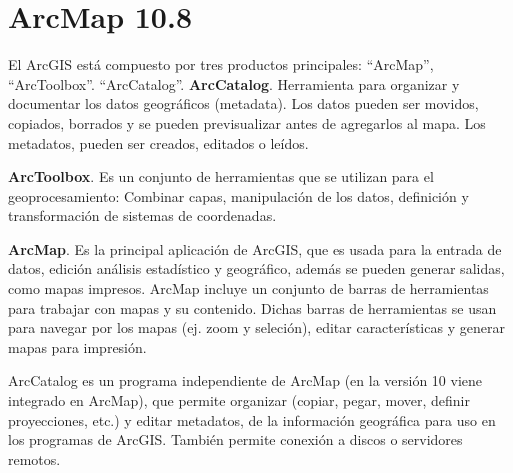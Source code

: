 \section{ArcMap 10.8}

El ArcGIS está compuesto por tres productos principales: ``ArcMap'', ``ArcToolbox''. ``ArcCatalog''.
\textbf{ArcCatalog}. Herramienta para organizar y documentar los datos geográficos (metadata). Los datos pueden ser movidos, copiados, borrados y se pueden previsualizar antes de agregarlos al mapa. Los metadatos, pueden ser creados, editados o leídos.

\textbf{ArcToolbox}. Es un conjunto de herramientas que se utilizan para el geoprocesamiento: Combinar capas, manipulación de los datos, definición y transformación de sistemas de coordenadas. 

\textbf{ArcMap}. Es la principal aplicación de ArcGIS, que es usada para la entrada de datos, edición análisis estadístico y geográfico, además se pueden generar salidas, como mapas impresos. ArcMap incluye un conjunto de barras de herramientas para trabajar con mapas y su contenido. Dichas barras de herramientas se usan para navegar por los mapas (ej. zoom y seleción), editar características y generar mapas para impresión.

ArcCatalog es un programa independiente de ArcMap (en la versión 10 viene integrado en ArcMap), que permite organizar (copiar, pegar, mover, definir proyecciones, etc.) y editar metadatos, de la información geográfica para uso en los programas de ArcGIS. También permite conexión a discos o servidores remotos.

